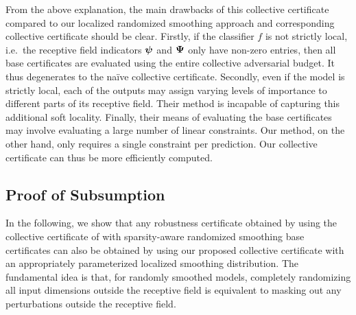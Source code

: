 From the above explanation, the main drawbacks of this collective certificate compared to our localized randomized smoothing approach and corresponding collective certificate should be clear.
Firstly, if the classifier $f$ is not strictly local, i.e.~the receptive field indicators ${\bm{\psi}}$ and ${\bm{\Psi}}$ only have non-zero entries, then all base certificates are evaluated using the entire collective adversarial budget. It thus degenerates to the na\"ive collective certificate.
Secondly, even if the model is strictly local, each of the outputs may assign varying levels of importance to different parts of its receptive field. Their method is incapable of capturing this additional soft locality.
Finally, their means of evaluating the base certificates may involve evaluating a large number of linear constraints. Our method, on the other hand, only requires a single constraint per prediction. Our collective certificate can thus be more efficiently computed.

\subsection{Proof of Subsumption}\label{section:subsumption_proof}
In the following, we show that any robustness certificate obtained by using the collective certificate of \citet{Schuchardt2021} with sparsity-aware randomized smoothing base certificates can also be obtained by using our proposed collective certificate with an appropriately parameterized localized smoothing distribution.
The fundamental idea is that, for randomly smoothed models, completely randomizing all input dimensions outside the receptive field is equivalent to masking out any perturbations outside the receptive field.

